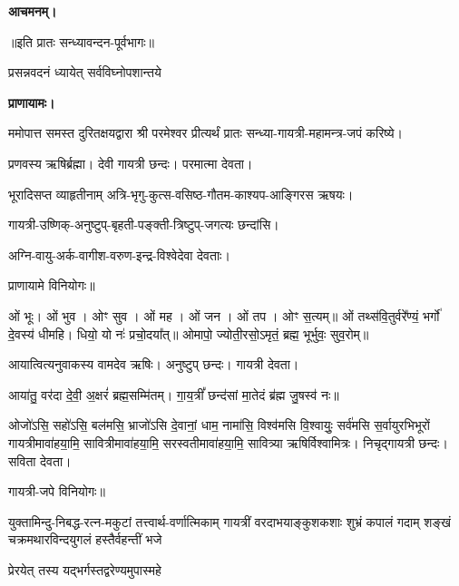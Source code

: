 \textbf{आचमनम्।}


\centerline{॥इति प्रातः सन्ध्यावन्दन-पूर्वभागः॥}



{प्रसन्नवदनं ध्यायेत् सर्वविघ्नोपशान्तये}

\textbf{प्राणायामः।}

ममोपात्त समस्त दुरितक्षयद्वारा श्री परमेश्वर प्रीत्यर्थं प्रातः सन्ध्या-गायत्री-महामन्त्र-जपं करिष्ये।


प्रणवस्य ऋषिर्ब्रह्मा।
देवी गायत्री छन्दः।
परमात्मा देवता।

भूरादिसप्त व्याहृतीनाम् अत्रि-भृगु-कुत्स-वसिष्ठ-गौतम-काश्यप-आङ्गिरस ऋषयः।

गायत्री-उष्णिक्-अनुष्टुप्-बृहती-पङ्क्ती-त्रिष्टुप्-जगत्यः छन्दांसि।

अग्नि-वायु-अर्क-वागीश-वरुण-इन्द्र-विश्वेदेवा देवताः।
      
प्राणायामे विनियोगः॥


ओं भूः। ओं भुव। ओꣳ सुव। ओं मह। ओं जन। ओं तप। ओꣳ स॒त्यम्॥
ओं तथ्स॑वि॒तुर्वरे᳚ण्यं॒ भर्गो॑ दे॒वस्य॑ धीमहि। धियो॒ यो नः॑ प्रचो॒दया᳚त्॥
ओमापो॒ ज्योती॒रसो॒ऽमृतं॒ ब्रह्म॒ भूर्भुवः॒ सुव॒रोम्॥




आयात्वित्यनुवाकस्य वामदेव ऋषिः।
अनुष्टुप् छन्दः।
गायत्री देवता।

आया॑तु॒ वर॑दा दे॒वी॒ अ॒क्षरं॑ ब्रह्म॒सम्मि॑तम्। गा॒य॒त्रीं᳚ छन्द॑सां मा॒तेदं ब्र॑ह्म जु॒षस्व॑ नः॥

ओजो॑ऽसि॒ सहो॑ऽसि॒ बल॑मसि॒ भ्राजो॑ऽसि दे॒वानां॒ धाम॒ नामा॑सि॒ विश्व॑मसि वि॒श्वायुः॒ सर्व॑मसि स॒र्वायुरभिभूरों गायत्रीमावा॑हया॒मि॒ सावित्रीमावा॑हया॒मि॒ सरस्वतीमावा॑ह\-या॒मि॒ सावित्र्या ऋषिर्विश्वामित्रः। निचृद्गायत्री छन्दः। सविता देवता।

गायत्री-जपे विनियोगः॥



{युक्तामिन्दु-निबद्ध-रत्न-मकुटां तत्त्वार्थ-वर्णात्मिकाम्}
{गायत्रीं वरदाभयाङ्कुशकशाः शुभ्रं कपालं गदाम्}
{शङ्खं चक्रमथारविन्दयुगलं हस्तैर्वहन्तीं भजे}

{प्रेरयेत् तस्य यद्भर्गस्तद्वरेण्यमुपास्महे}


